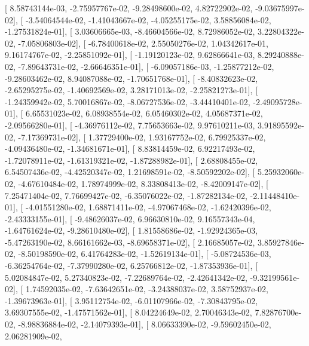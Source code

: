 \documentclass{article}
\begin{document}
       [  8.58743144e-03,  -2.75957767e-02,  -9.28498600e-02,
          4.82722902e-02,  -9.03675997e-02],
       [ -3.54064544e-02,  -1.41043667e-02,  -4.05255175e-02,
          3.58856084e-02,  -1.27531824e-01],
       [  3.03606665e-03,  -8.46604566e-02,   8.72986052e-02,
          3.22804322e-02,  -7.05806803e-02],
       [ -6.78400618e-02,   2.55050276e-02,   1.04342617e-01,
          9.16174767e-02,  -2.25851092e-01],
       [ -1.19120123e-02,   9.62866641e-03,   8.29240888e-02,
         -7.89643731e-02,  -2.66646351e-01],
       [ -6.09057186e-03,  -1.25877212e-02,  -9.28603462e-02,
          8.94087088e-02,  -1.70651768e-01],
       [ -8.40832623e-02,  -2.65295275e-02,  -1.40692569e-02,
          3.28171013e-02,  -2.25821273e-01],
       [ -1.24359942e-02,   5.70016867e-02,  -8.06727536e-02,
         -3.44410401e-02,  -2.49095728e-01],
       [  6.65531023e-02,   6.08938554e-02,   6.05460302e-02,
          4.05687371e-02,  -2.09566280e-01],
       [ -4.36976112e-02,   7.75653663e-02,   9.97610211e-03,
          3.91895592e-02,  -7.17369731e-02],
       [  1.37729400e-02,   1.93167752e-02,   6.79925337e-02,
         -4.09436480e-02,  -1.34681671e-01],
       [  8.83814459e-02,   6.92217493e-02,  -1.72078911e-02,
         -1.61319321e-02,  -1.87288982e-01],
       [  2.68808455e-02,   6.54507436e-02,  -4.42520347e-02,
          1.21698591e-02,  -8.50592202e-02],
       [  5.25932060e-02,  -4.67610484e-02,   1.78974999e-02,
          8.33808413e-02,  -8.42009147e-02],
       [  7.25471404e-02,   7.76699427e-02,  -6.35076022e-02,
         -1.87282134e-02,  -2.11448410e-01],
       [ -4.01551280e-02,   1.68871411e-02,  -4.97067468e-02,
         -1.62420396e-02,  -2.43333155e-01],
       [ -9.48626037e-02,   6.96630810e-02,   9.16557343e-04,
         -1.64761624e-02,  -9.28610480e-02],
       [  1.81558686e-02,  -1.92924365e-03,  -5.47263190e-02,
          8.66161662e-03,  -8.69658371e-02],
       [  2.16685057e-02,   3.85927846e-02,  -8.50198590e-02,
          6.41764283e-02,  -1.52619134e-01],
       [ -5.08724536e-03,  -6.36254764e-02,  -7.37990280e-02,
          6.25766812e-02,  -1.87353936e-01],
       [  5.02084847e-02,   5.27340823e-02,  -7.22689764e-02,
         -2.42641342e-02,  -9.32199561e-02],
       [  1.74592035e-02,  -7.63642651e-02,  -3.24388037e-02,
          3.58752937e-02,  -1.39673963e-01],
       [  3.95112754e-02,  -6.01107966e-02,  -7.30843795e-02,
          3.69307555e-02,  -1.47571562e-01],
       [  8.04224649e-02,   2.70046343e-02,   7.82876700e-02,
         -8.98836884e-02,  -2.14079393e-01],
       [  8.06633390e-02,  -9.59602450e-02,   2.06281909e-02,
\end{document}
